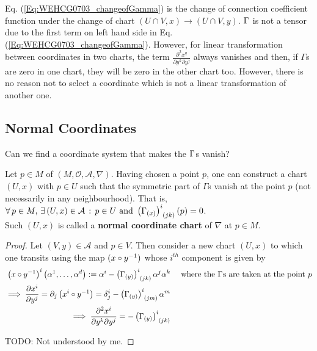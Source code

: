 Eq. (\ref{Eq:WEHCG0703_changeofGamma}) is the change of connection coefficient function under the change of chart $(U\cap V,x) \to (U\cap V,y)$. $\ccf{}{}$ is not a tensor due to the first term on left hand side in Eq. (\ref{Eq:WEHCG0703_changeofGamma}). However, for linear transformation between coordinates in two charts, the term $\frac{\partial^2 x^q}{\partial y^k \partial y^j}$ always vanishes and then, if $\Gamma$s are zero in one chart, they will be zero in the other chart too. However, there is no reason not to select a coordinate which is not a linear transformation of another one.

\subsection{Normal Coordinates}
Can we find a coordinate system that makes the $\ccf{}{}$s vanish?

\begin{theorem}
Let $p \in M$ of $(M, \mathcal{O}, \mathcal{A}, \nabla)$. Having chosen a point $p$, one can construct a chart $(U,x)$ with $p \in U$ such that the symmetric part of $\Gamma$s vanish at the point $p$ (not necessarily in any neighbourhood). That is, \\
$\displaystyle\forall \, p \in M, \, \exists \, (U,x) \in \mathcal{A} \, : \, p \in U \text{ and } \ccfx{i}{(jk)}{(x)}(p) = 0$. \\
Such $(U,x)$ is called a \textbf{normal coordinate chart} of $\nabla$ at $p \in M$.
\end{theorem}

\begin{proof}
Let $(V,y) \in \mathcal{A}$ and $p \in V$. Then consider a new chart $(U,x)$ to which one transits using the map $(x \circ y^{-1})$ whose $i^{th}$ component is given by\\
\begin{align*}
\left(x \after y^{-1}\right)^i\left(\alpha^1,\dotsc,\alpha^d\right) := \alpha^i - \ccfx{i}{(jk)}{(y)} \alpha^j \alpha^k && \text{ where the } \ccf{}{} \text{s are taken at the point } p \\ 
\implies \displaystyle\cibasis[x^i]{y^j} = \partial_j\left(x^i \after y^{-1}\right) = \delta^i_j - \ccfx{i}{(jm)}{(y)} \alpha^m \\
\implies \displaystyle\frac{\partial^2 x^i}{\partial y^k \partial y^j} = - \ccfx{i}{(jk)}{(y)} 
\end{align*}

TODO: Not understood by me.
\end{proof}
